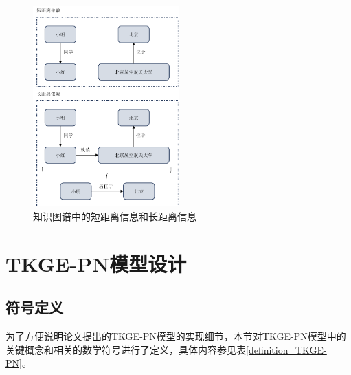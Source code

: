\begin{figure}[htb]
    \centerline{\includegraphics[width=0.5\textwidth]{pic/long-term-dependency.pdf}}
    \caption{知识图谱中的短距离信息和长距离信息}
    \label{long-term-dependency}
  \end{figure}

\section{TKGE-PN模型设计}

\subsection{符号定义}
为了方便说明论文提出的TKGE-PN模型的实现细节，本节对TKGE-PN模型中的关键概念和相关的数学符号进行了定义，具体内容参见表\ref{definition_TKGE-PN}。

\setlength{\tabcolsep}{20pt}

